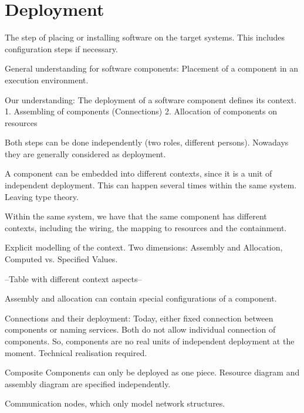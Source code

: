 \section{Deployment}
The step of placing or installing software on the target systems. This includes configuration steps if necessary.

General understanding for software components: Placement of a component in an execution environment.

Our understanding:
The deployment of a software component defines its context.
1.	Assembling of components (Connections)
2.	Allocation of components on resources

Both steps can be done independently (two roles, different persons). Nowadays they are generally considered as deployment.

A component can be embedded into different contexts, since it is a unit of independent deployment. This can happen several times within the same system. Leaving type theory.

Within the same system, we have that the same component has different contexts, including the wiring, the mapping to resources and the containment.

Explicit modelling of the context. 
Two dimensions: Assembly and Allocation, Computed vs. Specified Values.

--Table with different context aspects--

Assembly and allocation can contain special configurations of a component.

Connections and their deployment: Today, either fixed connection between components or naming services. Both do not allow individual connection of components. So, components are no real units of independent deployment at the moment. Technical realisation required.

Composite Components can only be deployed as one piece.
Resource diagram and assembly diagram are specified independently. 

Communication nodes, which only model network structures.
